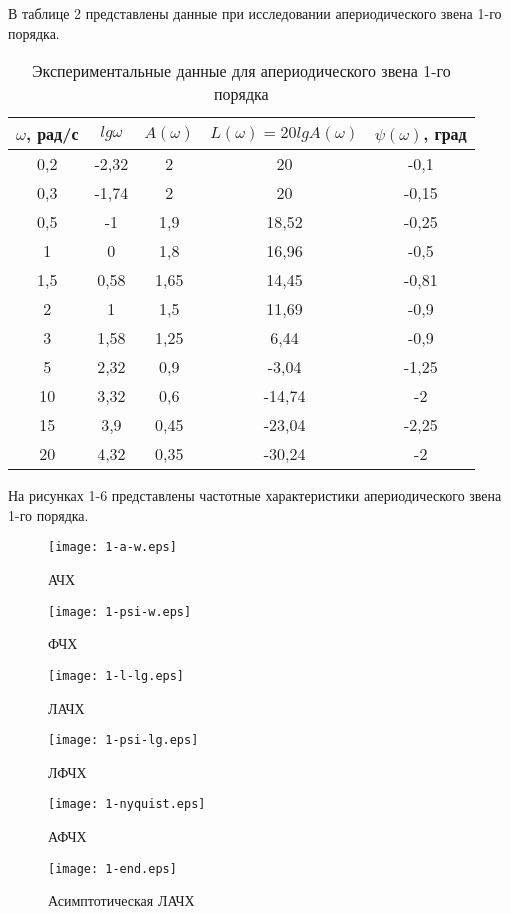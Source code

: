 \documentclass[12pt,a4paper]{article}
\begin{document}
В таблице 2 представлены данные при исследовании апериодического звена 1-го порядка.
\begin{table}[h!]
	\renewcommand{\arraystretch}{1.8} %
	\centering
	\begin{threeparttable}
	\caption{Экспериментальные данные для апериодического звена 1-го порядка}
	\begin{tabular}{|c|c|c|c|c|}
		\hline $\omega$, рад/с & $lg\omega$ & $A(\omega)$ & $L(\omega)=20lgA(\omega)$ & $\psi(\omega)$, град\\
		\hline 0,2 & -2,32 & 2 & 20 & -0,1\\
		\hline 0,3 & -1,74 & 2 & 20 & -0,15\\
		\hline 0,5 & -1 & 1,9 & 18,52 & -0,25\\
		\hline 1 & 0 & 1,8 & 16,96 & -0,5\\
		\hline 1,5 & 0,58 & 1,65 & 14,45 & -0,81\\
		\hline 2 & 1 & 1,5 & 11,69 & -0,9\\
		\hline 3 & 1,58 & 1,25 & 6,44 & -0,9\\
		\hline 5 & 2,32 & 0,9 & -3,04 & -1,25\\
		\hline 10 & 3,32 & 0,6 & -14,74 & -2\\
		\hline 15 & 3,9 & 0,45 & -23,04 & -2,25\\
		\hline 20 & 4,32 & 0,35 & -30,24 & -2\\
		\hline
	\end{tabular}
	\end{threeparttable}
\end{table}

На рисунках 1-6 представлены частотные характеристики апериодического звена 1-го порядка.
\begin{figure}[H]
	\centering
	\texttt{[image: 1-a-w.eps]}
	\caption{АЧХ}
\end{figure}
\begin{figure}[H]
	\centering
	\texttt{[image: 1-psi-w.eps]}
	\caption{ФЧХ}
\end{figure}
\begin{figure}[H]
	\centering
	\texttt{[image: 1-l-lg.eps]}
	\caption{ЛАЧХ}
\end{figure}
\begin{figure}[H]
	\centering
	\texttt{[image: 1-psi-lg.eps]}
	\caption{ЛФЧХ}
\end{figure}
\begin{figure}[H]
	\centering
	\texttt{[image: 1-nyquist.eps]}
	\caption{АФЧХ}
\end{figure}
\begin{figure}[H]
	\centering
	\texttt{[image: 1-end.eps]}
	\caption{Асимптотическая ЛАЧХ}
\end{figure}
\end{document}
